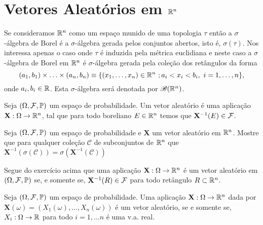 \section{Vetores Aleatórios em $\mathbb{R}^n$}

Se consideramos $\mathbb{R}^n$ como um espaço munido de uma 
topologia $\tau$ então a $\sigma$-álgebra de Borel 
é a $\sigma$-álgebra gerada pelos conjuntos abertos,
isto é, $\sigma(\tau)$.
Nos interessa apenas o caso onde $\tau$ é induzida 
pela métrica euclidiana e neste caso a 
$\sigma$-álgebra de Borel em $\mathbb{R}^n$ é 
$\sigma$-álgebra gerada pela coleção 
dos retângulos da forma 
	\[
		(a_1,b_1) \times\ldots\times (a_n,b_n)
		\equiv
		\{
		(x_1,\ldots,x_n)\in\mathbb{R}^n\ ; a_i<x_i<b_i,\ i=1,\ldots,n
		\},
	\]
onde $a_i,b_i\in \mathbb{R}$. Esta $\sigma$-álgebra será denotada
por $\mathscr{B}(\mathbb{R}^n)$.



\begin{definicao}
	Seja $(\Omega,\mathcal{F},\mathbb{P})$ um espaço de probabilidade.
	Um vetor aleatório é uma aplicação $\mathbf{X}:\Omega\to\mathbb{R}^n$,
	tal que para todo boreliano $E\in \mathbb{R}^n$ temos que 
	$\mathbf{X}^{-1}(E)\in \mathcal{F}$.
\end{definicao}


\begin{exercicio}
Seja $(\Omega,\mathcal{F},\mathbb{P})$ um espaço de probabilidade e 
$\mathbf{X}$ um vetor aleatório em $\mathbb{R}^n$.  
Mostre que para qualquer coleção 
$\mathcal{C}$ de subconjuntos de $\mathbb{R}^n$ que 
$
\mathbf{X}^{-1}(\sigma(\mathcal{C}))
=
\sigma(\mathbf{X}^{-1}(\mathcal{C}))
$
\end{exercicio}


Segue do exercício acima que uma
aplicação $\mathbf{X}:\Omega\to\mathbb{R}^n$ é um vetor aleatório
em $(\Omega,\mathcal{F},\mathbb{P})$ se, e somente se, 
$\mathbf{X}^{-1}(R)\in \mathcal{F}$ para todo retângulo $R\subset \mathbb{R}^n$.   



\begin{proposicao}\label{prop-caracterizacao-vetor-aleatorio}
Seja $(\Omega,\mathcal{F},\mathbb{P})$ um espaço de probabilidade.
Uma aplicação $\mathbf{X}:\Omega\to\mathbb{R}^n$ 
dada por $\mathbf{X}(\omega)=(X_1(\omega),\ldots,X_n(\omega))$
é um vetor aleatório, se e somente se, $X_i:\Omega\to\mathbb{R}$ 
para todo $i=1,\ldots n$ é uma v.a. real.
\end{proposicao}


